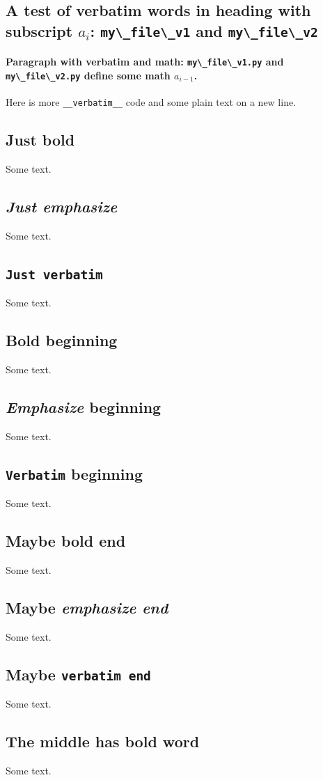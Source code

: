 \documentclass[%
oneside,                 %
final,                   %
10pt]{article}
\theoremstyle{definition}
\begin{document}
\begin{enumerate}
\subsection{A test of verbatim words in heading with subscript $a_i$: \protect\Verb!my\_file\_v1! and \protect\Verb!my\_file\_v2! }
\paragraph{Paragraph with verbatim and math: \protect\Verb!my\_file\_v1.py! and \protect\Verb!my\_file\_v2.py! define some math $a_{i-1}$.}
Here is more \Verb!__verbatim__! code and
some plain text on a new line.
\subsection{\textbf{Just bold}}
Some text.
\subsection{\emph{Just emphasize}}
Some text.
\subsection{\texttt{Just verbatim} }
Some text.
\subsection{\textbf{Bold} beginning}
Some text.
\subsection{\emph{Emphasize} beginning}
Some text.
\subsection{\texttt{Verbatim} beginning}
Some text.
\subsection{Maybe \textbf{bold end}}
Some text.
\subsection{Maybe \emph{emphasize end}}
Some text.
\subsection{Maybe \texttt{verbatim end} }
Some text.
\subsection{The middle has \textbf{bold} word}
Some text.

\end{enumerate}
\end{document}
